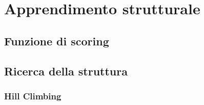 
\chapter{Apprendimento strutturale}
\label{cap:ctbn-structural-learning}
\omissis{}




\section{Funzione di scoring}\label{sec:ctbn-score}
\omissis{}

\section{Ricerca della struttura}\label{sec:ctbn-graph-search}
\omissis{}

\subsection{Hill Climbing}\label{sec:hc}
\omissis{}
